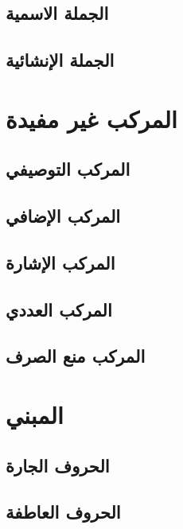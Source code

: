 \documentclass[11pt,twoside]{book}
\begin{document}
\section{الجملة الاسمية}


\section{الجملة الإنشائية}



\chapter{المركب غير مفيدة}


\section{المركب التوصيفي}


\section{المركب الإضافي}


\section{المركب الإشارة}


\section{المركب العددي}


\section{المركب منع الصرف}



\chapter{المبني}

\section{الحروف الجارة}


\section{الحروف العاطفة}

\end{document}
